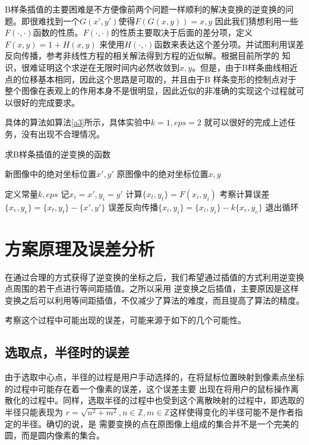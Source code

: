 \documentclass[UTF8,a4paper]{paper}\usepackage[utf8]{inputenc}\usepackage{algorithm}
\begin{document}
B样条插值的主要困难是不方便像前两个问题一样顺利的解决变换的逆变换的问题。即很难找到一个$G(x',y')$使得$F(G(x,y)) = x,y$
因此我们猜想利用一些$F(\cdot,\cdot)$函数的性质。$F(\cdot,\cdot)$的性质主要取决于后面的差分项，定义$F(x,y) = 1 + H(x,y)$
来使用$H(\cdot,\cdot)$函数来表达这个差分项。并试图利用误差反向传播，参考非线性方程的相关解法得到方程的近似解。根据目前所学的
知识，很难证明这个求逆在无限时间内必然收敛到$x,y$。但是，由于B样条曲线相近点的位移基本相同，因此这个思路是可取的，并且由于B
样条变形的控制点对于整个图像在表观上的作用本身不是很明显，因此近似的非准确的实现这个过程就可以很好的完成要求。

具体的算法如算法\ref{a3}所示，具体实验中$k = 1,eps = 2$ 就可以很好的完成上述任务，没有出现不合理情况。
\begin{algorithm}[h]\caption{求B样条插值的逆变换的函数}\label{a3}\begin{algorithmic}
    \Require 新图像中的绝对坐标位置$x',y'$
    \Ensure 原图像中的绝对坐标位置$x,y$\end{algorithmic}\begin{algorithmic}[1]
    \State 定义常量$k,eps$
    \State 记$x_i = x',y_i = y'$
    \State 计算$\{x_t,y_t\} = F(x_i,y_i)$
    \State 考察计算误差$\{x_e,y_e\} = \{x_t,y_t\} - \{x',y'\}$
    \State 误差反向传播$\{x_i,y_i\} = \{x_i,y_i\} - k\{x_e,y_e\}$
        \State 退出循环
    \EndIf
    \EndFor
    \EndFunction
\end{algorithmic}\end{algorithm}
\section{方案原理及误差分析}
在通过合理的方式获得了逆变换的坐标之后，我们希望通过插值的方式利用逆变换点周围的若干点进行等间距插值。之所以采用
逆变换之后插值，主要原因是这样变换之后可以利用等间距插值，不仅减少了算法的难度，而且提高了算法的精度。

考察这个过程中可能出现的误差，可能来源于如下的几个可能性。
\subsection{选取点，半径时的误差}
由于选取中心点，半径的过程是用户手动选择的，在将鼠标位置映射到像素点坐标的过程中可能存在着一个像素的误差，这个误差主要
出现在将用户的鼠标操作离散化的过程中。同样，选取半径的过程中也受到这个离散映射的过程中，即选取的半径只能表现为
$r = \sqrt{n^2 + m^2},n \in \mathbb{Z}, m \in\mathbb{Z}$这样使得变化的半径可能不是作者指定的半径。确切的说，是
需要变换的点在原图像上组成的集合并不是一个完美的圆，而是圆内像素的集合。
\end{document}
